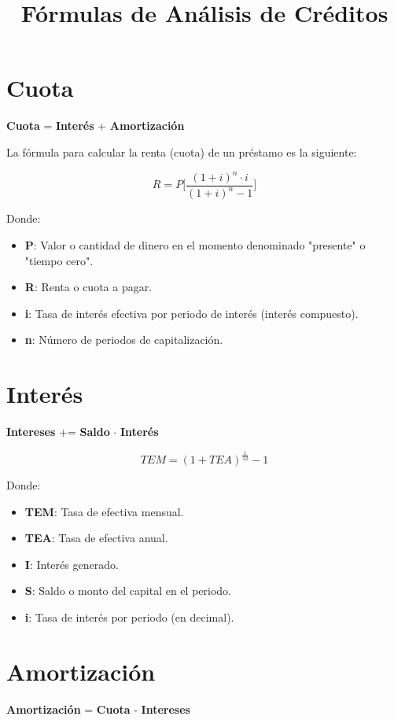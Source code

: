 \documentclass[11pt]{article}
\title{Fórmulas de Análisis de Créditos}
\author{}
\date{}
\begin{document}
\maketitle

\section{Cuota}

\begin{center}
    \textbf{Cuota} = \textbf{Interés} + \textbf{Amortización}
\end{center}

La fórmula para calcular la renta (cuota) de un préstamo es la siguiente:

\begin{equation}
    R = P \bigg[ \dfrac{(1 + i)^{n} \cdot i}{(1 + i)^{n} - 1}\bigg]
\end{equation}

Donde:
\begin{itemize}[label={--}]
    \item \textbf{P}: Valor o cantidad de dinero en el momento denominado "presente" o "tiempo cero".
    \item \textbf{R}: Renta o cuota a pagar.
    \item \textbf{i}: Tasa de interés efectiva por periodo de interés (interés compuesto).
    \item \textbf{n}: Número de periodos de capitalización.
\end{itemize}

\section{Interés}

\begin{center}
    \textbf{Intereses} += \textbf{Saldo} $\cdot$ \textbf{Interés}
\end{center}

\begin{equation}
    TEM = (1 + TEA)^{\frac{1}{12}} - 1
\end{equation}

Donde:
\begin{itemize}[label={--}]
    \item  \textbf{TEM}: Tasa de efectiva mensual.
    \item  \textbf{TEA}: Tasa de efectiva anual.
    \item \textbf{I}: Interés generado.
    \item \textbf{S}: Saldo o monto del capital en el periodo.
    \item \textbf{i}: Tasa de interés por periodo (en decimal).
\end{itemize}

\section{Amortización}

\begin{center}
    \textbf{Amortización} = \textbf{Cuota} - \textbf{Intereses}
\end{center}
\end{document}
